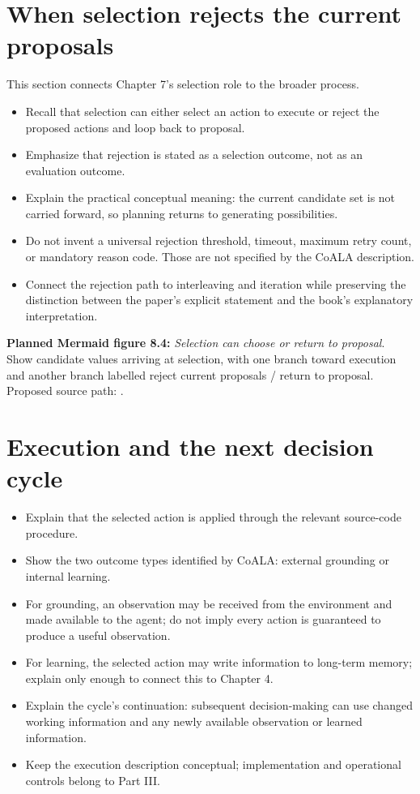 \section{When selection rejects the current proposals}
This section connects Chapter 7's selection role to the broader process.
\begin{itemize}
  \item Recall that selection can either select an action to execute or reject the proposed actions and loop back to proposal.
  \item Emphasize that rejection is stated as a selection outcome, not as an evaluation outcome.
  \item Explain the practical conceptual meaning: the current candidate set is not carried forward, so planning returns to generating possibilities.
  \item Do not invent a universal rejection threshold, timeout, maximum retry count, or mandatory reason code. Those are not specified by the CoALA description.
  \item Connect the rejection path to interleaving and iteration while preserving the distinction between the paper's explicit statement and the book's explanatory interpretation.
\end{itemize}
\textbf{Planned Mermaid figure 8.4:} \emph{Selection can choose or return to proposal}. Show candidate values arriving at selection, with one branch toward execution and another branch labelled reject current proposals / return to proposal. Proposed source path: .

\section{Execution and the next decision cycle}
\begin{itemize}
  \item Explain that the selected action is applied through the relevant source-code procedure.
  \item Show the two outcome types identified by CoALA: external grounding or internal learning.
  \item For grounding, an observation may be received from the environment and made available to the agent; do not imply every action is guaranteed to produce a useful observation.
  \item For learning, the selected action may write information to long-term memory; explain only enough to connect this to Chapter 4.
  \item Explain the cycle's continuation: subsequent decision-making can use changed working information and any newly available observation or learned information.
  \item Keep the execution description conceptual; implementation and operational controls belong to Part III.
\end{itemize}

